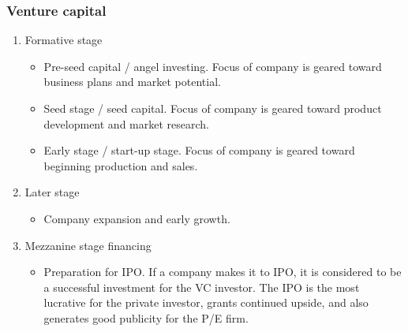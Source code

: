 \documentclass[../notes_compiled.tex]{subfiles}
\begin{document}
\subsubsection{Venture capital}
\begin{enumerate}
\item Formative stage
\begin{itemize}
\item Pre-seed capital / angel investing. Focus of company is geared toward business plans and market potential.
\item Seed stage / seed capital. Focus of company is geared toward product development and market research.
\item Early stage / start-up stage. Focus of company is geared toward beginning production and sales.
\end{itemize}
\item Later stage
\begin{itemize}
\item Company expansion and early growth.
\end{itemize}
\item Mezzanine stage financing
\begin{itemize}
\item Preparation for IPO. If a company makes it to IPO, it is considered to be a successful investment for the VC investor. The IPO is the most lucrative for the private investor, grants continued upside, and also generates good publicity for the P/E firm.
\end{itemize}
\end{enumerate}
\end{document}
